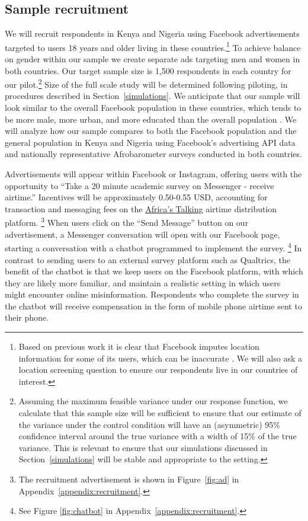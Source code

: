 \documentclass[letterpaper, 12pt, parskip=full,DIV=10]{scrartcl}
\begin{document}
\subsection{Sample recruitment}
We will recruit respondents in Kenya and Nigeria using Facebook advertisements targeted to users 18 years and older living in these countries.\footnote{Based on previous work it is clear that Facebook imputes location information for some of its users, which can be inaccurate \citep{Rosenzweig_2020}. We will also ask a location screening question to ensure our respondents live in our countries of interest.} %
To achieve balance on gender within our sample we create separate ads targeting men and women in both countries. Our target sample size is 1,500 respondents in each country for our pilot.\footnote{Assuming the maximum feasible variance under our response function, we calculate that this sample size will be sufficient to ensure that our estimate of the variance under the control condition will have an (asymmetric) 95\% confidence interval around the true variance with a width of 15\% of the true variance. This is relevant to ensure that our simulations discussed in Section~\ref{simulations} will be stable and appropriate to the setting.} Size of the full scale study will be determined following piloting, in procedures described in Section~\ref{simulations}. We anticipate that our sample will look similar to the overall Facebook population in these countries, which tends to be more male, more urban, and more educated than the overall population \citep{Rosenzweig_2020}. We will analyze how our sample compares to both the Facebook population and the general population in Kenya and Nigeria using Facebook's advertising API data and nationally representative Afrobarometer surveys conducted in both countries. 


Advertisements will appear within Facebook or Instagram, offering users with the opportunity to ``Take a 20 minute academic survey on Messenger - receive airtime.'' Incentives will be approximately 0.50-0.55 USD, accounting for transaction and messaging fees on the \href{https://africastalking.com/}{Africa's Talking} airtime distribution platform.%
\footnote{The recruitment advertisement is shown in Figure~\ref{fig:ad} in Appendix~\ref{appendix:recruitment}.} %
 When users click on the ``Send Message'' button on our advertisement, a Messenger conversation will open with our Facebook page, starting a conversation with a chatbot programmed to implement the survey.%
 \footnote{See Figure \ref{fig:chatbot} in Appendix~\ref{appendix:recruitment}.} %
 In contrast to sending users to an external survey platform such as Qualtrics, the benefit of the chatbot is that we keep users on the Facebook platform, with which they are likely more familiar, and maintain a realistic setting in which users might encounter online misinformation.  Respondents who complete the survey in the chatbot will receive compensation in the form of mobile phone airtime sent to their phone. %
\end{document}
